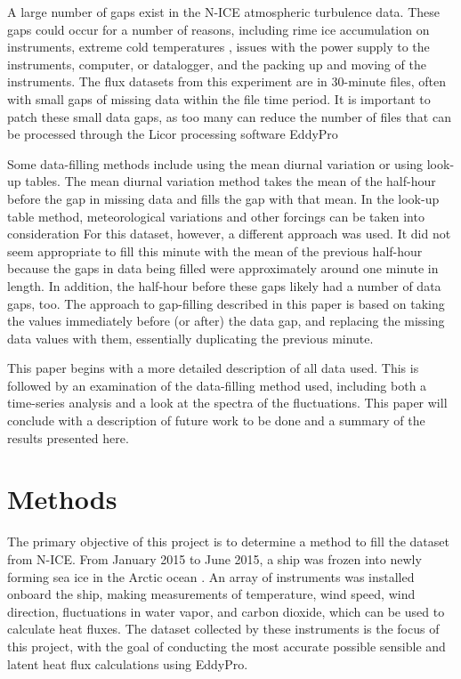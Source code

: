A large number of gaps exist in the N-ICE atmospheric turbulence data. These gaps could occur for a number of reasons, including rime ice accumulation on instruments, extreme cold temperatures \citep{cohen:2006}, issues with the power supply to the instruments, computer, or datalogger, and the packing up and moving of the instruments. The flux datasets from this experiment are in 30-minute files, often with small gaps of missing data within the file time period. It is important to patch these small data gaps, as too many can reduce the number of files that can be processed through the Licor processing software EddyPro \citep{epro, epro_man} 

Some data-filling methods include using the mean diurnal variation or using look-up tables. The mean diurnal variation method takes the mean of the half-hour before the gap in missing data and fills the gap with that mean. In the look-up table method, meteorological variations and other forcings can be taken into consideration \citep{falge:2001} For this dataset, however, a different approach was used. It did not seem appropriate to fill this minute with the mean of the previous half-hour because the gaps in data being filled were approximately around one minute in length. In addition, the half-hour before these gaps likely had a number of data gaps, too. The approach to gap-filling described in this paper is based on taking the values immediately before (or after) the data gap, and replacing the missing data values with them, essentially duplicating the previous minute.

This paper begins with a more detailed description of all data used. This is followed by an examination of the data-filling method used, including both a time-series analysis and a look at the spectra of the fluctuations. This paper will conclude with a description of future work to be done and a summary of the results presented here. 

\section{Methods}
The primary objective of this project is to determine a method to fill the dataset from N-ICE. From January 2015 to June 2015, a ship was frozen into newly forming sea ice in the Arctic ocean \citep{granskog:2016}. An array of instruments was installed onboard the ship, making measurements of temperature, wind speed, wind direction, fluctuations in water vapor, and carbon dioxide, which can be used to calculate heat fluxes. The dataset collected by these instruments is the focus of this project, with the goal of conducting the most accurate possible sensible and latent heat flux calculations using EddyPro. 

